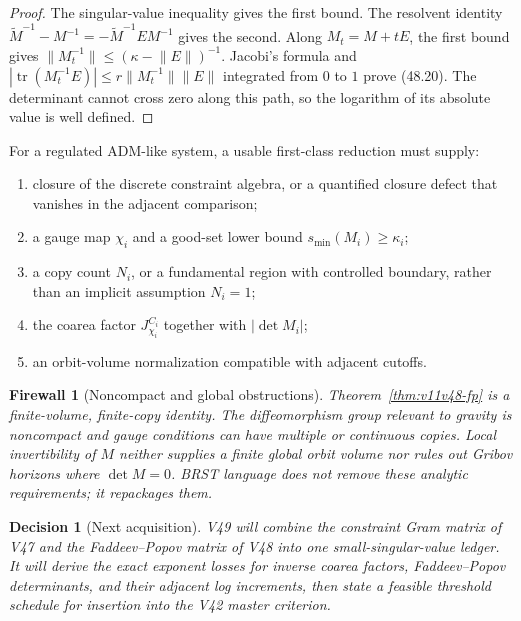 \documentclass[11pt]{article}
\newtheorem{firewall}[theorem]{Firewall}
\newtheorem{decision}[theorem]{Decision}
\begin{document}
\begin{proof}
The singular-value inequality gives the first bound.  The resolvent
identity
\(\widetilde M^{-1}-M^{-1}=-\widetilde M^{-1}EM^{-1}\)
gives the second.  Along \(M_t=M+tE\), the first bound gives
\(\lVert M_t^{-1}\rVert\le(\kappa-\lVert E\rVert)^{-1}\).
Jacobi's formula and
\(|\operatorname{tr}(M_t^{-1}E)|
 \le r\lVert M_t^{-1}\rVert\lVert E\rVert\)
integrated from \(0\) to \(1\) prove (48.20).  The determinant cannot
cross zero along this path, so the logarithm of its absolute value is
well defined.
\end{proof}

\begin{ledger}
\label{led:v11v48-gravity}
For a regulated ADM-like system, a usable first-class reduction must
supply:
\begin{enumerate}
\item closure of the discrete constraint algebra, or a quantified
closure defect that vanishes in the adjacent comparison;
\item a gauge map \(\chi_i\) and a good-set lower bound
\(s_{\min}(M_i)\ge\kappa_i\);
\item a copy count \(N_i\), or a fundamental region with controlled
boundary, rather than an implicit assumption \(N_i=1\);
\item the coarea factor \(J_{\chi_i}^{C_i}\) together with
\(|\det M_i|\);
\item an orbit-volume normalization compatible with adjacent cutoffs.
\end{enumerate}
\end{ledger}

\begin{firewall}[Noncompact and global obstructions]
\label{fire:v11v48-global}
Theorem~\ref{thm:v11v48-fp} is a finite-volume, finite-copy identity.
The diffeomorphism group relevant to gravity is noncompact and gauge
conditions can have multiple or continuous copies.  Local
invertibility of \(M\) neither supplies a finite global orbit volume
nor rules out Gribov horizons where \(\det M=0\).  BRST language does
not remove these analytic requirements; it repackages them.
\end{firewall}

\begin{decision}[Next acquisition]
\label{dec:v11v48-next}
V49 will combine the constraint Gram matrix of V47 and the
Faddeev--Popov matrix of V48 into one small-singular-value ledger.  It
will derive the exact exponent losses for inverse coarea factors,
Faddeev--Popov determinants, and their adjacent log increments, then
state a feasible threshold schedule for insertion into the V42 master
criterion.
\end{decision}
\end{document}
